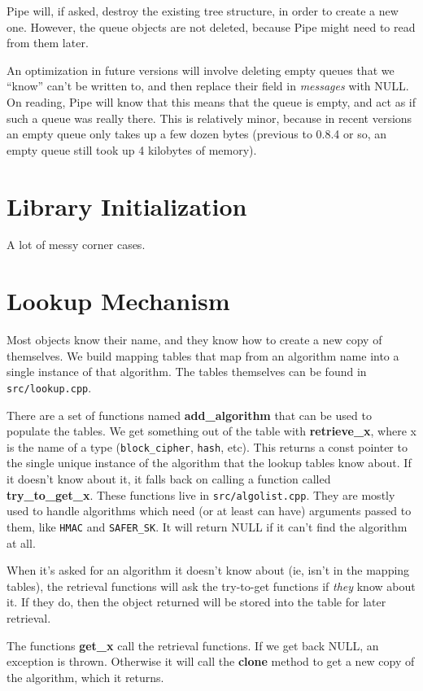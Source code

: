 \documentclass{article}
\newcommand{\filename}[1]{\texttt{#1}}
\newcommand{\function}[1]{\textbf{#1}}
\newcommand{\type}[1]{\texttt{#1}}
\renewcommand{\arg}[1]{\textsl{#1}}
\begin{document}
Pipe will, if asked, destroy the existing tree structure, in order to
create a new one. However, the queue objects are not deleted, because
Pipe might need to read from them later.

An optimization in future versions will involve deleting empty queues
that we ``know'' can't be written to, and then replace their field in
\arg{messages} with NULL. On reading, Pipe will know that this means
that the queue is empty, and act as if such a queue was really
there. This is relatively minor, because in recent versions an empty
queue only takes up a few dozen bytes (previous to 0.8.4 or so, an
empty queue still took up 4 kilobytes of memory).

\section{Library Initialization}

A lot of messy corner cases.

\section{Lookup Mechanism}

Most objects know their name, and they know how to create a new copy
of themselves. We build mapping tables that map from an algorithm name
into a single instance of that algorithm. The tables themselves can be
found in \filename{src/lookup.cpp}.

There are a set of functions named \function{add\_algorithm} that can
be used to populate the tables. We get something out of the table with
\function{retrieve\_x}, where x is the name of a type
(\texttt{block\_cipher}, \texttt{hash}, etc). This returns a const
pointer to the single unique instance of the algorithm that the lookup
tables know about. If it doesn't know about it, it falls back on
calling a function called \function{try\_to\_get\_x}. These functions
live in \filename{src/algolist.cpp}. They are mostly used to handle
algorithms which need (or at least can have) arguments passed to them,
like \type{HMAC} and \type{SAFER\_SK}. It will return NULL if it can't
find the algorithm at all.

When it's asked for an algorithm it doesn't know about (ie, isn't in
the mapping tables), the retrieval functions will ask the try-to-get
functions if \emph{they} know about it. If they do, then the object
returned will be stored into the table for later retrieval.

The functions \function{get\_x} call the retrieval functions. If we
get back NULL, an exception is thrown. Otherwise it will call the
\function{clone} method to get a new copy of the algorithm, which it
returns.
\end{document}

